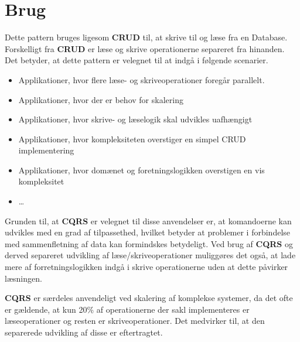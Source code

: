 \section{Brug}
Dette pattern bruges ligesom \textbf{CRUD} til, at skrive til og læse fra en Database. Forskelligt fra \textbf{CRUD} er læse og skrive operationerne separeret fra hinanden. Det betyder, at dette pattern er velegnet til at indgå i følgende scenarier.

\begin{itemize}  
	\item Applikationer, hvor flere læse- og skriveoperationer foregår parallelt.
	\item Applikationer, hvor der er behov for skalering
	\item Applikationer, hvor skrive- og læselogik skal udvikles uafhængigt
	\item Applikationer, hvor kompleksiteten overstiger en simpel CRUD implementering
	\item Applikationer, hvor domænet og foretningslogikken overstigen en vis kompleksitet
	\item \ldots
	
\end{itemize}

Grunden til, at \textbf{CQRS} er velegnet til disse anvendelser er, at komandoerne kan udvikles med en grad af tilpassethed, hvilket betyder at problemer i forbindelse med sammenfletning af data kan formindskes betydeligt.
Ved brug af \textbf{CQRS} og derved separeret udvikling af læse/skriveoperationer muliggøres det også, at lade mere af forretningslogikken indgå i skrive operationerne uden at dette påvirker læsningen.

\textbf{CQRS} er særdeles anvendeligt ved skalering af komplekse systemer, da det ofte er gældende, at kun 20\% af operationerne der sakl implementeres er læseoperationer og resten er skriveoperationer. Det medvirker til, at den separerede udvikling af disse er eftertragtet.
 


